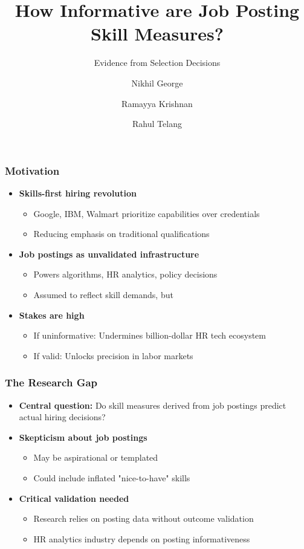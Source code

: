 \documentclass[aspectratio=169]{beamer}
\title{How Informative are Job Posting Skill Measures?}
\subtitle{Evidence from Selection Decisions}
\author{Nikhil George \and Ramayya Krishnan \and Rahul Telang}
\institute{Carnegie Mellon University}
\date{}
\begin{document}
\begin{frame}
\titlepage
\end{frame}

\begin{frame}
\frametitle{Motivation}

\begin{itemize}
\item \textbf{Skills-first hiring revolution}
  \begin{itemize}
  \item Google, IBM, Walmart prioritize capabilities over credentials
  \item Reducing emphasis on traditional qualifications
  \end{itemize}
\vspace{0.5em}

\item \textbf{Job postings as unvalidated infrastructure}
  \begin{itemize}
  \item Powers algorithms, HR analytics, policy decisions
  \item Assumed to reflect skill demands, but 
  \end{itemize}
\vspace{0.5em}

\item \textbf{Stakes are high}
  \begin{itemize}
  \item If uninformative: Undermines billion-dollar HR tech ecosystem
  \item If valid: Unlocks precision in labor markets
  \end{itemize}
\end{itemize}
\end{frame}

\begin{frame}
\frametitle{The Research Gap}

\begin{itemize}
\item \textbf{Central question:} Do skill measures derived from job postings predict actual hiring decisions?
\vspace{0.5em}

\item \textbf{Skepticism about job postings}
  \begin{itemize}
  \item May be aspirational or templated
  \item Could include inflated "nice-to-have" skills
  \end{itemize}
\vspace{0.5em}

\item \textbf{Critical validation needed}
  \begin{itemize}
  \item Research relies on posting data without outcome validation
  \item HR analytics industry depends on posting informativeness
  \end{itemize}
\end{itemize}
\end{frame}
\end{document}
